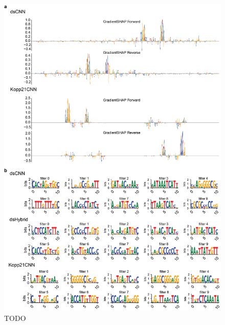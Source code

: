 \begin{figure}[p]
    \centering
    \includegraphics[width=\textwidth]{1_figures-and-files/suppfigure3.png}
    \caption[TODO]{TODO
    }
    \label{fig:supplementary_3}
\end{figure}

